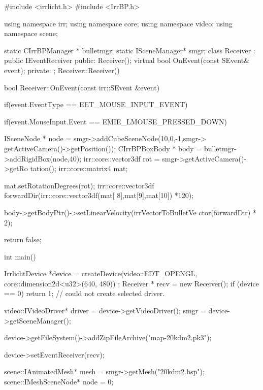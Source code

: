 \begin{DoxyCode}
#include <irrlicht.h>
#include <IrrBP.h>

using namespace irr;
using namespace core;
using namespace video;
using namespace scene;


static CIrrBPManager * bulletmgr;
static ISceneManager* smgr;
class Receiver : public IEventReceiver
{
public:
                Receiver();
                virtual bool OnEvent(const SEvent& event);
private:
};
Receiver::Receiver()
{

}

bool Receiver::OnEvent(const irr::SEvent &event)
{

        if(event.EventType == EET_MOUSE_INPUT_EVENT)
        {
                if(event.MouseInput.Event == EMIE_LMOUSE_PRESSED_DOWN)
                {
                        ISceneNode * node = smgr->addCubeSceneNode(10,0,-1,smgr->
      getActiveCamera()->getPosition());
                        CIrrBPBoxBody * body = bulletmgr->addRigidBox(node,40);
                        irr::core::vector3df rot = smgr->getActiveCamera()->getRo
      tation();
                        irr::core::matrix4 mat;
        
                        mat.setRotationDegrees(rot);
                        irr::core::vector3df forwardDir(irr::core::vector3df(mat[
      8],mat[9],mat[10]) *120);

                        body->getBodyPtr()->setLinearVelocity(irrVectorToBulletVe
      ctor(forwardDir) * 2);
        
                }
                
        }

                                
        return false;
}
int main()
{

        

        IrrlichtDevice *device =
                createDevice(video::EDT_OPENGL, core::dimension2d<u32>(640, 480))
      ;
        Receiver * recv = new Receiver();
        if (device == 0)
                return 1; // could not create selected driver.
        
        video::IVideoDriver* driver = device->getVideoDriver();
         smgr = device->getSceneManager();

        device->getFileSystem()->addZipFileArchive("map-20kdm2.pk3");

        device->setEventReceiver(recv);

        scene::IAnimatedMesh* mesh = smgr->getMesh("20kdm2.bsp");
        scene::IMeshSceneNode* node = 0;

}
\end{DoxyCode}
